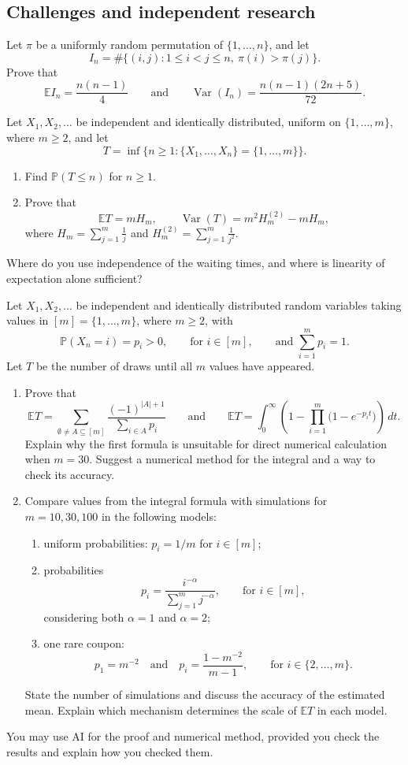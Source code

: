 \documentclass[11pt,a4paper]{article}
\newenvironment{enumeratea}{\begin{enumerate}[label=(\alph*),itemsep=0.28em,topsep=0.25em]}{\end{enumerate}}
\newcommand{\Pbb}{\mathbb P}
\newcommand{\Ebb}{\mathbb E}
\newcommand{\Var}{\operatorname{Var}}
\newcounter{problem}[section]
\begin{document}
\subsection*{Challenges and independent research}
\begin{problemstar}
Let $\pi$ be a uniformly random permutation of $\{1,\dots,n\}$, and let
\[ I_n=\#\{(i,j):1\le i<j\le n,\ \pi(i)>\pi(j)\}. \]
Prove that
\[ \Ebb I_n=\frac{n(n-1)}4\qquad\text{and}\qquad\Var(I_n)=\frac{n(n-1)(2n+5)}{72}. \]
\end{problemstar}
\begin{problemstar}
Let $X_1,X_2,\dots$ be independent and identically distributed, uniform on
$\{1,\dots,m\}$, where $m\ge2$, and let
\[ T=\inf\{n\ge1:\{X_1,\dots,X_n\}=\{1,\dots,m\}\}. \]
\begin{enumeratea}
  \item Find $\Pbb(T\le n)$ for $n\ge1$.
  \item Prove that
  \[ \Ebb T=mH_m,\qquad\Var(T)=m^2H_m^{(2)}-mH_m, \]
  where $H_m=\sum_{j=1}^m\frac1j$ and $H_m^{(2)}=\sum_{j=1}^m\frac1{j^2}$.
\end{enumeratea}
Where do you use independence of the waiting times, and where is linearity of expectation alone sufficient?
\end{problemstar}
\begin{researchtask}
Let $X_1,X_2,\dots$ be independent and identically distributed random variables
taking values in $[m]=\{1,\dots,m\}$, where $m\ge2$, with
\[
\Pbb(X_n=i)=p_i>0,\qquad\text{for }i\in[m],
\qquad\text{and }\sum_{i=1}^m p_i=1.
\]
Let $T$ be the number of draws until all $m$ values have appeared.
\begin{enumeratea}
  \item Prove that
  \[
  \Ebb T=\sum_{\emptyset\ne A\subseteq[m]}\frac{(-1)^{|A|+1}}{\sum_{i\in A}p_i}
  \qquad\text{and}\qquad
  \Ebb T=\int_0^\infty\left(1-\prod_{i=1}^m\bigl(1-e^{-p_it}\bigr)\right)\,dt.
  \]
  Explain why the first formula is unsuitable for direct numerical calculation
  when $m=30$. Suggest a numerical method for the integral and a way to check its accuracy.
  \item Compare values from the integral formula with simulations for $m=10,30,100$
  in the following models:
  \begin{enumerate}[label=(\roman*)]
    \item uniform probabilities: $p_i=1/m$ for $i\in[m]$;
    \item probabilities
    \[ p_i=\frac{i^{-\alpha}}{\sum_{j=1}^m j^{-\alpha}},\qquad\text{for }i\in[m], \]
    considering both $\alpha=1$ and $\alpha=2$;
    \item one rare coupon:
    \[ p_1=m^{-2}\quad\text{and}\quad p_i=\frac{1-m^{-2}}{m-1},\qquad\text{for }i\in\{2,\dots,m\}. \]
  \end{enumerate}
  State the number of simulations and discuss the accuracy of the estimated mean.
  Explain which mechanism determines the scale of $\Ebb T$ in each model.
\end{enumeratea}
You may use AI for the proof and numerical method, provided you check the results
and explain how you checked them.
\end{researchtask}
\end{document}
